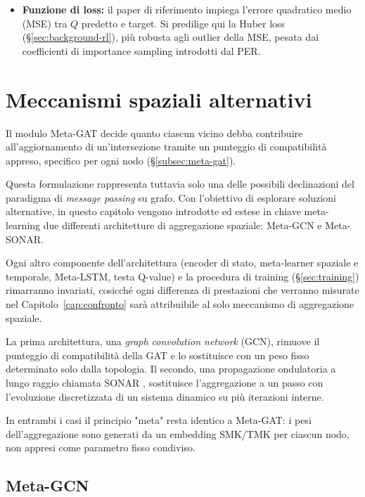 \begin{itemize}
  \item \textbf{Funzione di loss:} il paper di riferimento impiega l'errore quadratico medio (MSE) tra $Q$ predetto e target. Si predilige qui la Huber loss (§\ref{sec:background-rl}), più robusta agli outlier della MSE, pesata dai coefficienti di importance sampling introdotti dal PER.
\end{itemize}


\section{Meccanismi spaziali alternativi}
\label{sec:spatial-alt}

Il modulo Meta-GAT decide quanto ciascun vicino debba contribuire
all'aggiornamento di un'intersezione tramite un punteggio di compatibilità
appreso, specifico per ogni nodo (§\ref{subsec:meta-gat}).

Questa formulazione rappresenta tuttavia solo una delle possibili declinazioni del paradigma di \emph{message passing} su grafo.
Con l'obiettivo di esplorare soluzioni alternative, in questo capitolo vengono introdotte ed estese in chiave meta-learning due differenti architetture di aggregazione spaziale: Meta-GCN e Meta-SONAR.

Ogni altro componente dell'architettura (encoder di stato, meta-learner
spaziale e temporale, Meta-LSTM, testa Q-value) e la procedura di training (§\ref{sec:training}) rimarranno invariati,
cosicché ogni differenza di prestazioni che verranno misurate nel Capitolo~\ref{cap:confronto} sarà attribuibile al solo
meccanismo di aggregazione spaziale.

La prima architettura, una \emph{graph convolution network} (GCN), rimuove il punteggio di compatibilità della GAT e lo sostituisce
con un peso fisso determinato solo dalla topologia.
Il secondo, una propagazione ondulatoria a lungo raggio chiamata SONAR \citep{trenta2025sonar},
sostituisce l'aggregazione a un passo con l'evoluzione discretizzata di un sistema dinamico su più iterazioni interne.

In entrambi i casi il principio "meta" resta identico a Meta-GAT:
i pesi dell'aggregazione sono generati da un embedding SMK/TMK per ciascun nodo, non appresi come parametro fisso condiviso.

\subsection{Meta-GCN}
\label{subsec:meta-gcn}


